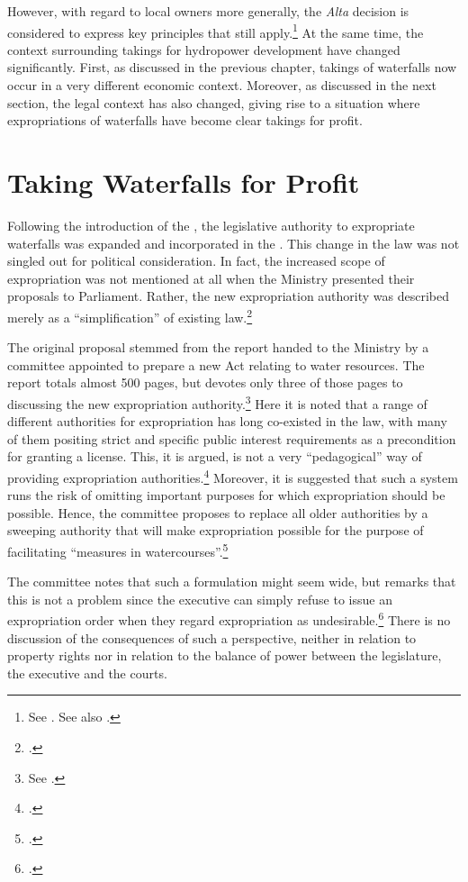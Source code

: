 However, with regard to local owners more generally, the {\it Alta} decision is considered to express key principles that still apply.\footnote{See \cite{jorpeland11}. See also \cite[312]{haagensen02}.} 
At the same time, the context surrounding takings for hydropower development have changed significantly. First, as discussed in the previous chapter, takings of waterfalls now occur in a very different economic context. Moreover, as discussed in the next section, the legal context has also changed, giving rise to a situation where expropriations of waterfalls have become clear takings for profit.

\section{Taking Waterfalls for Profit}\label{sec:5:5}

Following the introduction of the \cite{wra00}, the legislative authority to expropriate waterfalls  was expanded and incorporated in the \cite{ea59}. This change in the law was not singled out for political consideration. In fact, the increased scope of expropriation was not mentioned at all when the Ministry presented their proposals to Parliament. Rather, the new expropriation authority was described merely as a ``simplification'' of existing law.\footcite[223-225]{otprp39}

The original proposal stemmed from the report handed to the Ministry by a committee appointed to prepare a new Act relating to water resources. The report totals almost 500 pages, but devotes only three of those pages to discussing the new expropriation authority.\footnote{See \cite[235-237]{nou94}.} Here it is noted that a range of different authorities for expropriation has long co-existed in the law, with many of them positing strict and specific public interest requirements as a precondition for granting a license. This, it is argued, is not a very ``pedagogical'' way of providing expropriation authorities.\footcite[235]{nou94} Moreover, it is suggested that such a system runs the risk of omitting important purposes for which expropriation should be possible. Hence, the committee proposes to replace all older authorities by a sweeping authority that will make expropriation possible for the purpose of facilitating ``measures in watercourses''.\footcite[235-236]{nou94}

The committee notes that such a formulation might seem wide, but remarks that this is not a problem since the executive can simply refuse to issue an expropriation order when they regard expropriation as undesirable.\footcite[235]{nou94} There is no discussion of the consequences of such a perspective, neither in relation to property rights nor in relation to the balance of power between the legislature, the executive and the courts.

